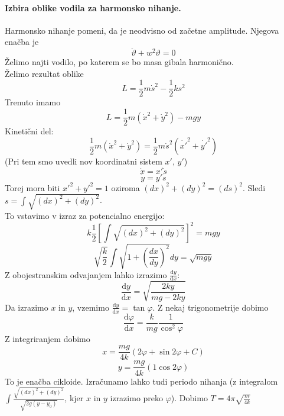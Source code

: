 \documentclass[a4paper]{article}
\newcommand{\dd}[2]{\frac{\mathrm{d} {#1}}{\mathrm{d} {#2}}}
\begin{document}
\paragraph{Izbira oblike vodila za harmonsko nihanje.} Harmonsko nihanje pomeni, da je neodvisno od začetne amplitude. Njegova enačba je
$$\ddot\vartheta + w^2\vartheta = 0$$
Želimo najti vodilo, po katerem se bo masa gibala harmonično. \\
Želimo rezultat oblike $$L = \frac{1}{2} m\dot{s}^2 - \frac{1}{2}ks^2$$
Trenuto imamo $$L = \frac{1}{2}m(\dot{x}^2 + \dot{y}^2) - mgy$$
Kinetični del: $$\frac{1}{2}m(\dot{x}^2 + \dot{y}^2) = \frac{1}{2}m\dot{s}^2(\dot{x'}^2 + \dot{y'}^2)$$
(Pri tem smo uvedli nov koordinatni sistem $x',\, y'$)
$$\dot x = x' \dot s$$
$$\dot y = y' \dot s$$
Torej mora biti $x'^2 + y'^2 = 1$ oziroma $\displaystyle{(dx)^2 + (dy)^2 = (ds)^2}$. Sledi $\displaystyle{s = \int \sqrt{(dx)^2 + (dy)^2}}$. \\
To vstavimo v izraz za potencialno energijo: $$k\frac{1}{2}\left[\int \sqrt{(dx)^2 + (dy)^2}\right]^2 = mgy$$
$$\sqrt{\frac{k}{2}}\int \sqrt{1 + \left(\frac{dx}{dy}\right)^2}dy = \sqrt{mgy}$$
Z obojestranskim odvajanjem lahko izrazimo $\displaystyle{\dd{y}{x}}$:
$$\dd{y}{x} = \sqrt{\frac{2ky}{mg - 2ky}}$$
Da izrazimo $x$ in $y$, vzemimo $\displaystyle{\dd{y}{x} = \tan\varphi}$. Z nekaj trigonometrije dobimo $$\dd{\varphi}{x} = \frac{k}{mg}\frac{1}{\cos^2\varphi}$$
Z integriranjem dobimo
$$x = \frac{mg}{4k}(2\varphi + \sin2\varphi + C)$$
$$y = \frac{mg}{4k}(1 \cos2\varphi)$$
To je enačba cikloide. Izračunamo lahko tudi periodo nihanja (z integralom $\displaystyle{\int \frac{\sqrt{(dx)^2 + (dy)^2}}{\sqrt{2g(y - y_0)}}}$,
kjer $x$ in $y$ izrazimo preko $\varphi$). Dobimo $\displaystyle{T = 4\pi \sqrt{\frac{m}{4k}}}$
\end{document}
